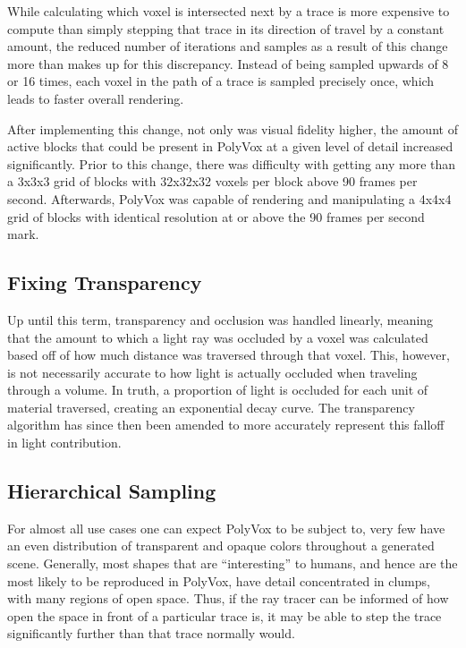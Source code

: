 \documentclass[onecolumn, draftclsnofoot,10pt, compsoc]{IEEEtran}
\begin{document}
While calculating which voxel is intersected next by a trace is more expensive to compute than simply stepping that trace in its direction of travel by a constant amount, the reduced number of iterations and samples as a result of this change more than makes up for this discrepancy. Instead of being sampled upwards of 8 or 16 times, each voxel in the path of a trace is sampled precisely once, which leads to faster overall rendering.

After implementing this change, not only was visual fidelity higher, the amount of active blocks that could be present in PolyVox at a given level of detail increased significantly. Prior to this change, there was difficulty with getting any more than a 3x3x3 grid of blocks with 32x32x32 voxels per block above 90 frames per second. Afterwards, PolyVox was capable of rendering and manipulating a 4x4x4 grid of blocks with identical resolution at or above the 90 frames per second mark.

\subsection{Fixing Transparency}

Up until this term, transparency and occlusion was handled linearly, meaning that the amount to which a light ray was occluded by a voxel was calculated based off of how much distance was traversed through that voxel. This, however, is not necessarily accurate to how light is actually occluded when traveling through a volume. In truth, a proportion of light is occluded for each unit of material traversed, creating an exponential decay curve. The transparency algorithm has since then been amended to more accurately represent this falloff in light contribution.

\subsection{Hierarchical Sampling}

For almost all use cases one can expect PolyVox to be subject to, very few have an even distribution of transparent and opaque colors throughout a generated scene. Generally, most shapes that are “interesting” to humans, and hence are the most likely to be reproduced in PolyVox, have detail concentrated in clumps, with many regions of open space. Thus, if the ray tracer can be informed of how open the space in front of a particular trace is, it may be able to step the trace significantly further than that trace normally would.
\end{document}

